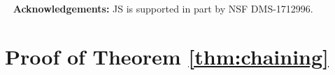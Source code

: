 


\newline~\newline
\noindent
{\bf Acknowledgements:} JS is supported in part by NSF DMS-1712996.





\appendix

\section{Proof of Theorem \ref{thm:chaining}}

